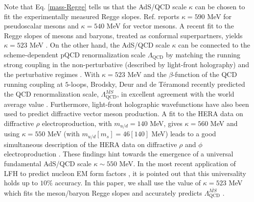 \documentclass{PoS}
\begin{document}
Note that Eq. \eqref{mass-Regge} tells us that the AdS/QCD scale $\kappa$ can be chosen to fit the experimentally measured Regge slopes. Ref. \cite{Brodsky:2014yha} reports $\kappa=590$ MeV for pseudoscalar mesons and $\kappa=540$ MeV for vector mesons.  A recent fit to the  Regge slopes of mesons and baryons, treated as conformal superpartners, yields  $\kappa=523$ MeV \cite{Brodsky:2016rvj}. On the other hand, the AdS/QCD scale $\kappa$ can be connected to the scheme-dependent pQCD renormalization scale $\Lambda_{\text{QCD}}$ by matching the running strong coupling in the non-perturbative (described by light-front holography) and the perturbative regimes \cite{Brodsky:2010ur}. With $\kappa=523$ MeV and the $\beta$-function of the QCD running coupling at $5$-loops,  Brodsky, Deur and de T\'eramond recently predicted the QCD renormalization scale, $\Lambda^{{\overline{MS}}}_{\text{QCD}}$, in excellent agreement with the world average value \cite{Deur:2016opc}. Furthermore, light-front holographic wavefunctions have also been used to predict diffractive vector meson production\cite{Forshaw:2012im,Ahmady:2016ujw}. A fit to the HERA data on diffractive $\rho$ electroproduction, with $m_{u/d}=140$ MeV, gives $\kappa=560$ MeV\cite{Forshaw:2012im} and using $\kappa=550$ MeV (with $m_{u/d}[m_s]=46[140]$ MeV) leads to a good simultaneous description of the HERA data on diffractive $\rho$ and $\phi$ electroproduction \cite{Ahmady:2016ujw}. These findings hint towards the emergence of a  universal fundamental AdS/QCD scale $\kappa \sim 550$ MeV. In the most recent application of LFH to predict nucleon EM form factors \cite{Sufian:2016hwn}, it is pointed out that this universality holds up to $10\%$ accuracy. In this paper, we shall use the value of $\kappa=523$ MeV which fits the meson/baryon Regge slopes and accurately predicts $\Lambda^{{\overline{MS}}}_{\text{QCD}}$ \cite{Brodsky:2016rvj, Deur:2016opc}.   
\end{document}
